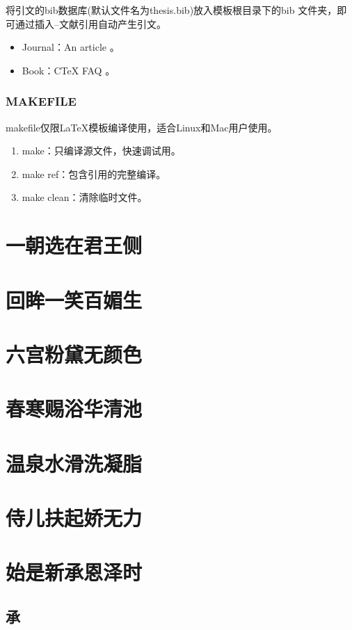 \documentclass{LZUthesis}
\begin{document}
将引文的bib数据库(默认文件名为thesis.bib)放入模板根目录下的bib 文件夹，即可通过插入--文献引用自动产生引文。
\begin{itemize}
\item Journal：An article \cite{Liu13PRA-A}。
\item Book：C\TeX{} FAQ \cite{Wu05-C}。
\end{itemize}


\subsection{MAKEFILE}

makefile仅限\LaTeX{}模板编译使用，适合Linux和Mac用户使用。
\begin{enumerate}
\item make：只编译源文件，快速调试用。
\item make ref：包含引用的完整编译。
\item make clean：清除临时文件。
\end{enumerate}

\chapter{一朝选在君王侧}


\chapter{回眸一笑百媚生}
\chapter{六宫粉黛无颜色}
\chapter{春寒赐浴华清池}
\chapter{温泉水滑洗凝脂}
\chapter{侍儿扶起娇无力}
\chapter{始是新承恩泽时}
\section{承}
\end{document}
